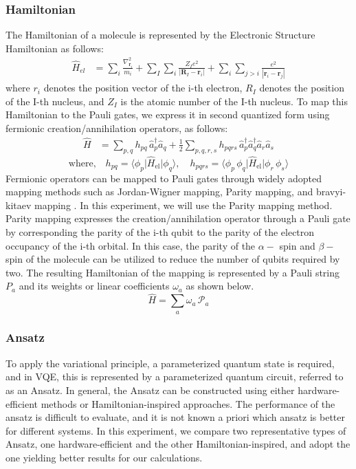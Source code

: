 \documentclass[pdflatex,sn-mathphys-num]{sn-jnl}%
\theoremstyle{thmstyleone}%
\theoremstyle{thmstyletwo}%
\theoremstyle{thmstylethree}%
\begin{document}
\subsubsection{Hamiltonian}\label{subsec2.2.1}
The Hamiltonian of a molecule is represented by the Electronic Structure Hamiltonian as follows:
\begin{align}
\hat{H}_{el} 
&= \sum_{i} \frac{\nabla_{\mathbf{r}_i}^2}{m_i}
+ \sum_{I} \sum_{i} \frac{Z_I e^2}{\left| \mathbf{R}_I - \mathbf{r}_i \right|}
+ \sum_{i} \sum_{j>i} \frac{e^2}{\left| \mathbf{r}_i - \mathbf{r}_j \right|}
\end{align}
where \(r_i\) denotes the position vector of the i-th electron, 
\(R_I\) denotes the position of the I-th nucleus, and \(Z_I\) is the atomic number of the I-th nucleus. 
To map this Hamiltonian to the Pauli gates, we express it in second quantized form using fermionic creation/annihilation operators\cite{2NDQ1,2NDQ2,2NDQ3}, as follows:
\begin{align}
\hat{H} 
&= \sum_{p,q} h_{pq} \, \hat{a}_p^{\dagger} \hat{a}_q
+ \frac{1}{2} \sum_{p,q,r,s} h_{pqrs} \, \hat{a}_p^{\dagger} \hat{a}_q^{\dagger} \hat{a}_r \hat{a}_s
\end{align}
\begin{equation*}
\text{where,} \quad 
h_{pq} = \langle \phi_p \vert \hat{H}_{\mathrm{el}} \vert \phi_q \rangle, \quad
h_{pqrs} = \langle \phi_p \, \phi_q \vert \hat{H}_{\mathrm{el}} \vert \phi_r \, \phi_s \rangle
\end{equation*}
Fermionic operators can be mapped to Pauli gates through widely adopted mapping methods such as Jordan-Wigner mapping, Parity mapping, and bravyi-kitaev mapping \cite{MAP1,MAP2}. 
In this experiment, we will use the Parity mapping method. 
Parity mapping expresses the creation/annihilation operator through a Pauli gate by corresponding the parity of the i-th qubit to the parity of the electron occupancy of the i-th orbital. 
In this case, the parity of the \(\alpha-\) spin and \(\beta-\) spin of the molecule can be utilized to reduce the number of qubits required by two. 
The resulting Hamiltonian of the mapping is represented by a Pauli string \(P_a\) and its weights or linear coefficients \(\omega_a\) as shown below.
\begin{equation}
\hat{H} = \sum_{a} \omega_{a} \, \mathcal{P}_{a}
\end{equation}

\subsubsection{Ansatz}\label{subsec2.2.2}
To apply the variational principle, a parameterized quantum state is required, and in VQE, this is represented by a parameterized quantum circuit, 
referred to as an Ansatz. In general, the Ansatz can be constructed using either hardware-efficient methods or Hamiltonian-inspired approaches.
The performance of the ansatz is difficult to evaluate, and it is not known a priori which ansatz is better for different systems. 
In this experiment, we compare two representative types of Ansatz, one hardware-efficient and the other Hamiltonian-inspired, and adopt the one yielding better results for our calculations.
\end{document}
